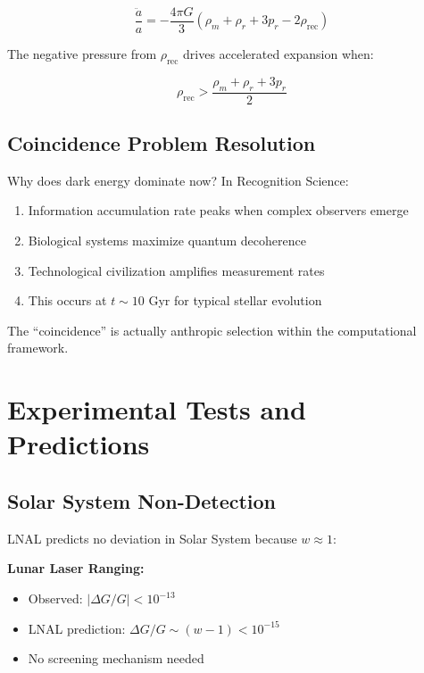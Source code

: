 \documentclass[12pt,letterpaper]{article}
\begin{document}
\begin{equation}
\frac{\ddot{a}}{a} = -\frac{4\pi G}{3}(\rho_m + \rho_r + 3p_r - 2\rho_{\text{rec}})
\label{eq:friedmann2}
\end{equation}

The negative pressure from $\rho_{\text{rec}}$ drives accelerated expansion when:

\begin{equation}
\rho_{\text{rec}} > \frac{\rho_m + \rho_r + 3p_r}{2}
\label{eq:accel_condition}
\end{equation}

\subsection{Coincidence Problem Resolution}

Why does dark energy dominate now? In Recognition Science:

\begin{enumerate}
\item Information accumulation rate peaks when complex observers emerge
\item Biological systems maximize quantum decoherence
\item Technological civilization amplifies measurement rates
\item This occurs at $t \sim 10$ Gyr for typical stellar evolution
\end{enumerate}

The ``coincidence'' is actually anthropic selection within the computational framework.

\section{Experimental Tests and Predictions}
\label{sec:predictions}

\subsection{Solar System Non-Detection}

LNAL predicts no deviation in Solar System because $w \approx 1$:

\textbf{Lunar Laser Ranging:}
\begin{itemize}
\item Observed: $|\Delta G/G| < 10^{-13}$
\item LNAL prediction: $\Delta G/G \sim (w-1) < 10^{-15}$
\item No screening mechanism needed
\end{itemize}
\end{document}
